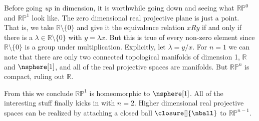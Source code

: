     \hfill
    \par\vspace{2.5ex}
    \hfill
    \begin{minipage}[b]{0.54\textwidth}
        Before going \textit{up} in dimension, it is worthwhile going
        down and seeing what $\mathbb{RP}^{0}$ and $\mathbb{RP}^{1}$
        look like. The zero dimensional real projective plane is just a
        point. That is, we take $\mathbb{R}\setminus\{0\}$ and give it
        the equivalence relation $xRy$ if and only if there is a
        $\lambda\in\mathbb{R}\setminus\{0\}$ with $y=\lambda{x}$. But
        this is true of every non-zero element since
        $\mathbb{R}\setminus\{0\}$ is a group under multiplication.
        Explicitly, let $\lambda=y/x$. For $n=1$ we can note that there
        are only two connected topological manifolds of dimension 1,
        $\mathbb{R}$ and $\nsphere[1]$, and all of the real projective
        spaces are manifolds. But $\mathbb{RP}^{n}$ is compact, ruling
        out $\mathbb{R}$.
    \end{minipage}
    \par\vspace{2.5ex}
    From this we conclude $\mathbb{RP}^{1}$ is homeomorphic to
    $\nsphere[1]$. All of the interesting stuff finally kicks in with
    $n=2$. Higher dimensional real projective spaces can be realized by
    attaching a closed ball $\closure[]{\nball}$ to $\mathbb{RP}^{n-1}$.

